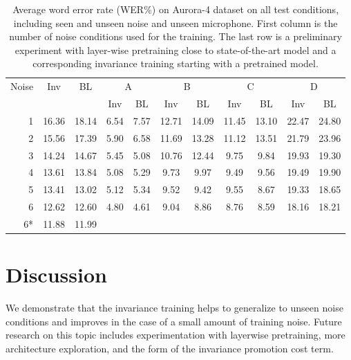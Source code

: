 \documentclass{article}
\begin{document}
\begin{table}
    \centering
    \caption{Average word error rate (WER\%) on Aurora-4 dataset on all test conditions,
        including seen and unseen noise and unseen microphone. First column
        is the number of noise conditions used for the training. The last row is a 
        preliminary experiment with layer-wise pretraining close to state-of-the-art
        model and a corresponding invariance training starting with a pretrained model.}
    \label{tab:results}
    \begin{tabular}{r|cc||cc|cc|cc|cc}
        Noise       &Inv&BL&  \multicolumn{2}{c|}{A} & \multicolumn{2}{c|}{B} & \multicolumn{2}{c|}{C} & \multicolumn{2}{c}{D}\\
               & & &  Inv & BL & Inv & BL & Inv & BL & Inv & BL\\
    \hline
    1           &16.36        &18.14 &6.54&7.57    &12.71& 14.09   & 11.45&   13.10    & 22.47 &   24.80    \\
    2           &15.56        &17.39 &5.90&  6.58 &   11.69   &13.28   &11.12   &13.51   &21.79   &23.96 \\
    3           &14.24        &14.67 &5.45 & 5.08&    10.76&   12.44&   9.75&    9.84 &   19.93&   19.30\\
    4           &13.61        &13.84 & 5.08 &5.29    &9.73    &9.97    &9.49    &9.56    &19.49   &19.90\\         
    5           &13.41        &13.02 & 5.12 &5.34    &9.52    &9.42    &9.55    &8.67    &19.33   &18.65\\         
    6           &12.62        &12.60 & 4.80 &4.61    &9.04    &8.86    &8.76    &8.59    &18.16   &18.21\\
    \hline\hline
    6* &11.88        &11.99
    \end{tabular}
\end{table}

\section{Discussion}
    We demonstrate that the invariance training helps to generalize to unseen noise
    conditions and improves in the case of a small amount of training noise. Future
    research on this topic includes experimentation with layerwise pretraining,
    more architecture exploration, and the form of the invariance promotion cost term. 
    
\end{document}
